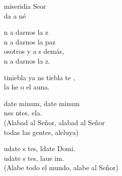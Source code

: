 \documentclass[12pt]{article}
\begin{document}
\begin{multicols*}{2}
\begin{cancion}%
	miseridia  Seor\\
	da a né\\
\end{cancion}%

\begin{cancion}[La paz][]%
	n a darnos la z\\
	n a darnos la paz\\
	osotros y a s demás,\\
	n a darnos la z.\\
\end{cancion}%

\begin{cancion}%
	tiniebla ya ns tiebla te ,\\
	la he o el auna. \\
\end{cancion}%

\begin{cancion}%
	date minum, date minum\\
	nes ntes, ela.\\
(Alabad al Señor, alabad al Señor\\
 todas las gentes, aleluya)\\
\end{cancion}%

\begin{cancion}%
	udate s tes, ldate Domi.\\
	udate s tes, laue im.\\
(Alabe todo el mundo, alabe al Señor)\\
\end{cancion}%


\end{multicols*}
\end{document}
